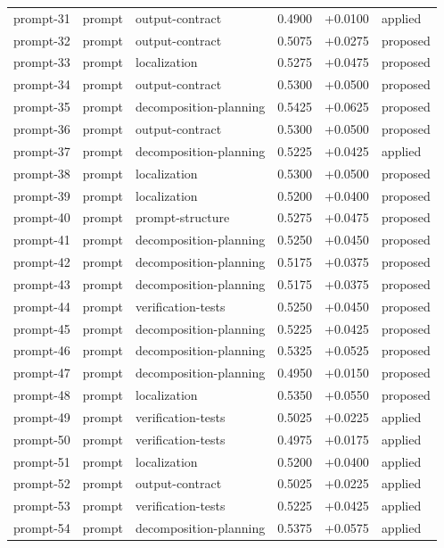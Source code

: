 \begin{center}
\begin{longtable}{llp{5.2cm}rrl}
prompt-31 & prompt & output-contract & 0.4900 & +0.0100 & applied \\
prompt-32 & prompt & output-contract & 0.5075 & +0.0275 & proposed \\
prompt-33 & prompt & localization & 0.5275 & +0.0475 & proposed \\
prompt-34 & prompt & output-contract & 0.5300 & +0.0500 & proposed \\
prompt-35 & prompt & decomposition-planning & 0.5425 & +0.0625 & proposed \\
prompt-36 & prompt & output-contract & 0.5300 & +0.0500 & proposed \\
prompt-37 & prompt & decomposition-planning & 0.5225 & +0.0425 & applied \\
prompt-38 & prompt & localization & 0.5300 & +0.0500 & proposed \\
prompt-39 & prompt & localization & 0.5200 & +0.0400 & proposed \\
prompt-40 & prompt & prompt-structure & 0.5275 & +0.0475 & proposed \\
prompt-41 & prompt & decomposition-planning & 0.5250 & +0.0450 & proposed \\
prompt-42 & prompt & decomposition-planning & 0.5175 & +0.0375 & proposed \\
prompt-43 & prompt & decomposition-planning & 0.5175 & +0.0375 & proposed \\
prompt-44 & prompt & verification-tests & 0.5250 & +0.0450 & proposed \\
prompt-45 & prompt & decomposition-planning & 0.5225 & +0.0425 & proposed \\
prompt-46 & prompt & decomposition-planning & 0.5325 & +0.0525 & proposed \\
prompt-47 & prompt & decomposition-planning & 0.4950 & +0.0150 & proposed \\
prompt-48 & prompt & localization & 0.5350 & +0.0550 & proposed \\
prompt-49 & prompt & verification-tests & 0.5025 & +0.0225 & applied \\
prompt-50 & prompt & verification-tests & 0.4975 & +0.0175 & applied \\
prompt-51 & prompt & localization & 0.5200 & +0.0400 & applied \\
prompt-52 & prompt & output-contract & 0.5025 & +0.0225 & applied \\
prompt-53 & prompt & verification-tests & 0.5225 & +0.0425 & applied \\
prompt-54 & prompt & decomposition-planning & 0.5375 & +0.0575 & applied \\

\end{longtable}
\end{center}
